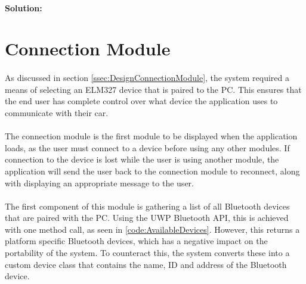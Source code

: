 {{{			\paragraph{Solution:}
		}
	}

\section{Connection Module}
		\paragraph{}{
		As discussed in section \ref{ssec:DesignConnectionModule}, the system required a means of selecting an ELM327 device that is paired to the PC. This ensures that the end user has complete control over what device the application uses to communicate with their car.
		}
		
		\paragraph{}{
		The connection module is the first module to be displayed when  the application loads, as the user must connect to a device before using any other modules. If connection to the device is lost while the user is using another module, the application will send the user back to the connection module to reconnect, along with displaying an appropriate message to the user.
		}
		
		\paragraph{}{
		The first component of this module is gathering a list of all Bluetooth devices that are paired	with the PC. Using the UWP Bluetooth API, this is achieved with one method call, as seen in \ref{code:AvailableDevices}. However, this returns a platform specific Bluetooth devices, which has a negative impact on the portability of the system. To counteract this, the system converts these into a custom device class that contains the name, ID and address of the Bluetooth device.
		}
		}
		
